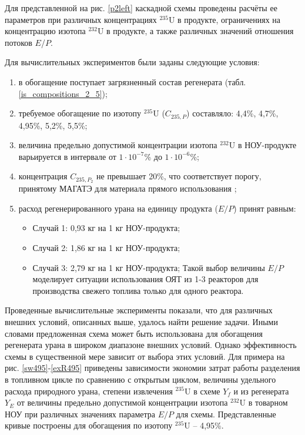 Для представленной на рис. \ref{p2left} каскадной схемы проведены расчёты ее параметров при различных концентрациях $^{235}$U в продукте, ограничениях на концентрацию изотопа $^{232}$U в продукте, а также различных значений отношения потоков $E$/$P$.

Для вычислительных экспериментов были заданы следующие условия:

\begin{enumerate}
    \item в обогащение поступает загрязненный состав регенерата (табл. \ref{is_compositions_2_5}); 
    \item требуемое обогащение по изотопу $^{235}$U ($C_{235,P}$) составляло: 4,4\%, 4,7\%, 4,95\%, 5,2\%, 5,5\%;    
    \item величина предельно допустимой концентрации изотопа $^{232}$U в НОУ-продукте варьируется в интервале от $1\cdot10^{-7}$\% до $1\cdot10^{-6}$\%;
    \item концентрация $C_{235,{P_2}}$ не превышает 20\%, что соответствует порогу, принятому МАГАТЭ для материала прямого использования \cite{alekseevConceptUseRecycled2010};
    \item расход регенерированного урана на единицу продукта ($E/P$) принят равным:
    \begin{itemize}
        \item Случай 1: 0,93 кг на 1 кг НОУ-продукта;
        \item Случай 2: 1,86 кг на 1 кг НОУ-продукта;
        \item Случай 3: 2,79 кг на 1 кг НОУ-продукта;        
        Такой выбор величины $E/P$ моделирует ситуации использования ОЯТ из 1-3 реакторов для производства свежего топлива только для одного реактора.
    \end{itemize}
\end{enumerate}

Проведенные вычислительные эксперименты показали, что для различных внешних условий, описанных выше, удалось найти решение задачи. Иными словами предложенная схема может быть использована для обогащения регенерата урана в широком диапазоне внешних условий. Однако эффективность схемы в существенной мере зависит от выбора этих условий. Для примера на рис. \ref{sw495}-\ref{exR495} приведены зависимости экономии затрат работы разделения в топливном цикле по сравнению с открытым циклом, величины удельного расхода природного урана, степени извлечения $^{235}$U в схеме $Y_f$ и из регенерата $Y_{E}$ от величины предельно допустимой концентрации изотопа $^{232}$U в товарном НОУ при различных значениях параметра $E/P$ для схемы. Представленные кривые построены для обогащения по изотопу $^{235}$U -- 4,95\%.

